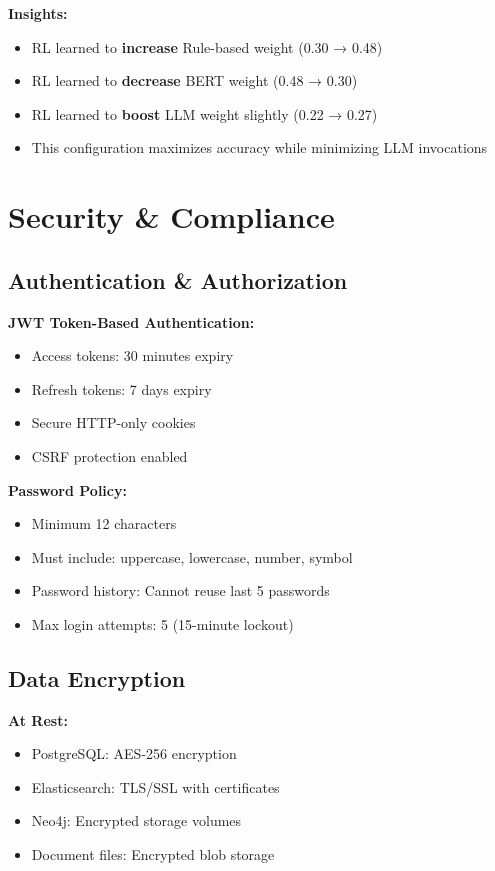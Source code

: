 \textbf{Insights:}
\begin{itemize}
    \item RL learned to \textbf{increase} Rule-based weight (0.30 → 0.48)
    \item RL learned to \textbf{decrease} BERT weight (0.48 → 0.30)
    \item RL learned to \textbf{boost} LLM weight slightly (0.22 → 0.27)
    \item This configuration maximizes accuracy while minimizing LLM invocations
\end{itemize}

\section{Security \& Compliance}

\subsection{Authentication \& Authorization}

\textbf{JWT Token-Based Authentication:}
\begin{itemize}
    \item Access tokens: 30 minutes expiry
    \item Refresh tokens: 7 days expiry
    \item Secure HTTP-only cookies
    \item CSRF protection enabled
\end{itemize}

\textbf{Password Policy:}
\begin{itemize}
    \item Minimum 12 characters
    \item Must include: uppercase, lowercase, number, symbol
    \item Password history: Cannot reuse last 5 passwords
    \item Max login attempts: 5 (15-minute lockout)
\end{itemize}

\subsection{Data Encryption}

\textbf{At Rest:}
\begin{itemize}
    \item PostgreSQL: AES-256 encryption
    \item Elasticsearch: TLS/SSL with certificates
    \item Neo4j: Encrypted storage volumes
    \item Document files: Encrypted blob storage
\end{itemize}

